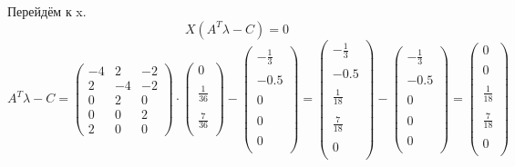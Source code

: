 \documentclass{article}
\begin{document}
Перейдём к x.
\[X(A^T\lambda - C) = 0\]
\[A^T\lambda - C =\begin{pmatrix}
    -4&2&-2\\
    2&-4&-2\\
    0&2&0\\
    0&0&2\\
    2&0&0
\end{pmatrix} \cdot
\begin{pmatrix}
    0\\
    \\
    \frac{1}{36}\\
    \\
    \frac{7}{36}\\
\end{pmatrix}-
\begin{pmatrix}
    -\frac{1}{3}\\
    \\
    -0.5\\
    \\
    0\\
    \\
    0\\
    \\
    0\\
\end{pmatrix}
= 
\begin{pmatrix}
    -\frac{1}{3}\\
    \\
    -0.5\\
    \\
    \frac{1}{18}\\
    \\
    \frac{7}{18}\\
    \\
    0\\
\end{pmatrix}-
\begin{pmatrix}
    -\frac{1}{3}\\
    \\
    -0.5\\
    \\
    0\\
    \\
    0\\
    \\
    0\\
\end{pmatrix} =
\begin{pmatrix}
    0\\
    \\
    0\\
    \\
    \frac{1}{18}\\
    \\
    \frac{7}{18}\\
    \\
    0\\
\end{pmatrix}
\]
\end{document}
